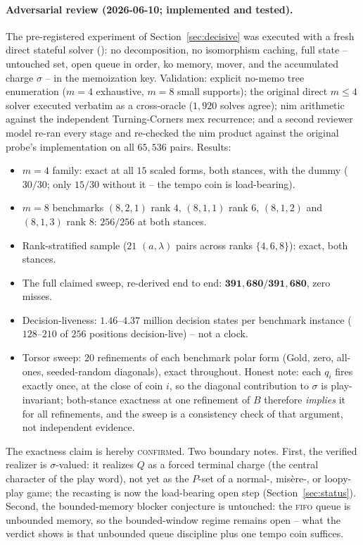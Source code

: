 \documentclass[11pt]{article}
\theoremstyle{plain}
\theoremstyle{definition}
\begin{document}
\paragraph{Adversarial review (2026-06-10; implemented and tested).}
The pre-registered experiment of Section~\ref{sec:decisive} was executed
with a fresh direct stateful solver ():
no decomposition, no isomorphism caching, full state -- untouched set,
open queue in order, ko memory, mover, and the accumulated charge $\sigma$
-- in the memoization key. Validation: explicit no-memo tree enumeration
($m=4$ exhaustive, $m=8$ small supports); the original direct $m\leq4$
solver executed verbatim as a cross-oracle ($1{,}920$ solves agree); nim
arithmetic against the independent Turning-Corners mex recurrence; and a
second reviewer model re-ran every stage and re-checked the nim product
against the original probe's implementation on all $65{,}536$ pairs.
Results:
\begin{itemize}[leftmargin=*,itemsep=0pt]
\item $m=4$ family: exact at all $15$ scaled forms, both stances, with the
dummy ($30/30$; only $15/30$ without it -- the tempo coin is load-bearing).
\item $m=8$ benchmarks $(8,2,1)$ rank $4$, $(8,1,1)$ rank $6$, $(8,1,2)$
and $(8,1,3)$ rank $8$: $256/256$ at both stances.
\item Rank-stratified sample ($21$ $(a,\lambda)$ pairs across ranks
$\{4,6,8\}$): exact, both stances.
\item The full claimed sweep, re-derived end to end:
$\mathbf{391{,}680/391{,}680}$, zero misses.
\item Decision-liveness: $1.46$--$4.37$ million decision states per
benchmark instance ($128$--$210$ of $256$ positions decision-live) -- not
a clock.
\item Torsor sweep: $20$ refinements of each benchmark polar form (Gold,
zero, all-ones, seeded-random diagonals), exact throughout. Honest note:
each $q_i$ fires exactly once, at the close of coin $i$, so the diagonal
contribution to $\sigma$ is play-invariant; both-stance exactness at one
refinement of $B$ therefore \emph{implies} it for all refinements, and the
sweep is a consistency check of that argument, not independent evidence.
\end{itemize}

The exactness claim is hereby \textsc{confirm}ed. Two boundary notes.
First, the verified realizer is $\sigma$-valued: it realizes $Q$ as a
forced terminal charge (the central character of the play word), not yet
as the $P$-set of a normal-, misère-, or loopy-play game; the recasting
is now the load-bearing open step (Section~\ref{sec:status}). Second, the
bounded-memory blocker conjecture is untouched: the \textsc{fifo} queue is
unbounded memory, so the bounded-window regime remains open -- what the
verdict shows is that unbounded queue discipline plus one tempo coin
suffices.
\end{document}
